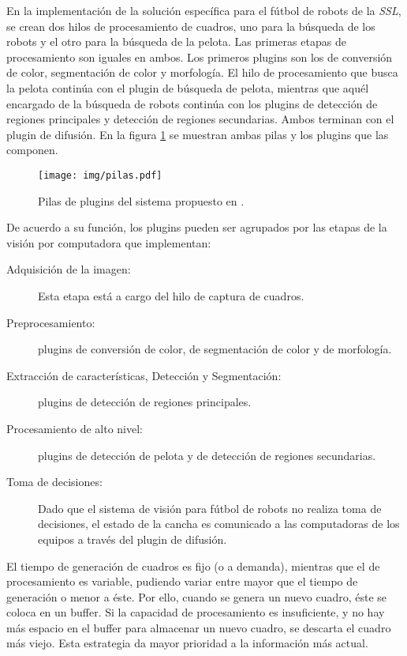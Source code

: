 En la implementación de la solución específica para el fútbol de robots de la
\emph{SSL}, se crean dos hilos de procesamiento de cuadros, uno para la búsqueda
de los robots y el otro para la búsqueda de la pelota. Las primeras etapas de
procesamiento son iguales en ambos. Los primeros plugins son los de conversión
de color, segmentación de color y morfología. El hilo de procesamiento que busca
la pelota continúa con el plugin de búsqueda de pelota, mientras que aquél
encargado de la búsqueda de robots continúa con los plugins de detección de
regiones principales y detección de regiones secundarias. Ambos terminan con el
plugin de difusión. En la figura \ref{pilasPlugins} se muestran ambas pilas y
los plugins que las componen.

\begin{figure}[!h]

	\texttt{[image: img/pilas.pdf]}

	\caption{Pilas de plugins del sistema propuesto en \cite{torres2014}.}

	\label{pilasPlugins}

\end{figure}


De acuerdo a su función, los plugins pueden ser agrupados por las etapas de la
visión por computadora que implementan:

\begin{description}

	\item[Adquisición de la imagen:] Esta etapa está a cargo del hilo de
		captura de cuadros.

	\item[Preprocesamiento:] plugins de conversión de color, de segmentación
		de color y de morfología.

	\item[Extracción de características, Detección y Segmentación:] plugins
		de detección de regiones principales.

	\item[Procesamiento de alto nivel:] plugins de detección de pelota y de
		detección de regiones secundarias.

	\item[Toma de decisiones:] Dado que el sistema de visión para fútbol de
		robots no realiza toma de decisiones, el estado de la cancha es
		comunicado a las computadoras de los equipos a través del plugin
		de difusión.

\end{description}

El tiempo de generación de cuadros es fijo (o a demanda), mientras que el de
procesamiento es variable, pudiendo variar entre mayor que el tiempo de
generación o menor a éste. Por ello, cuando se genera un nuevo cuadro, éste se
coloca en un buffer. Si la capacidad de procesamiento es insuficiente, y no
hay más espacio en el buffer para almacenar un nuevo cuadro, se descarta el
cuadro más viejo. Esta estrategia da mayor prioridad a la información más
actual.

